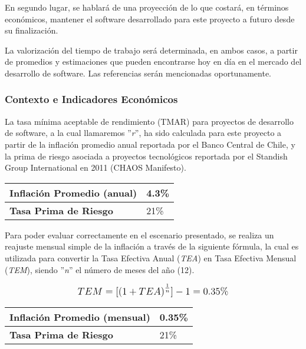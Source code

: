 En segundo lugar, se hablará de una proyección de lo que costará, en términos económicos, mantener el software desarrollado para este proyecto a futuro desde su finalización.

La valorización del tiempo de trabajo será determinada, en ambos casos, a partir de promedios y estimaciones que pueden encontrarse hoy en día en el mercado del desarrollo de software. Las referencias serán mencionadas oportunamente.

\subsubsection{Contexto e Indicadores Económicos}
\label{feasibility:economic:context}
La tasa mínima aceptable de rendimiento (TMAR) para proyectos de desarrollo de software, a la cual llamaremos ''\textit{r}'', ha sido calculada para este proyecto a partir de la inflación promedio anual reportada por el Banco Central de Chile, y la prima de riesgo asociada a proyectos tecnológicos reportada por el Standish Group International en 2011 (CHAOS Manifesto).

\begin{center}
	\begin{tabular}{ | p{7cm} | p{5cm}|}
		\hline
		{\textbf{Inflación Promedio (anual)}} & 4.3\%  \\ \hline
		{\textbf{Tasa Prima de Riesgo}} & 21\% \\ \hline
	\end{tabular}
\end{center}

Para poder evaluar correctamente en el escenario presentado, se realiza un reajuste mensual simple de la inflación a través de la siguiente fórmula, la cual es utilizada para convertir la Tasa Efectiva Anual (\textit{TEA}) en Tasa Efectiva Mensual (\textit{TEM}), siendo ''\textit{n}'' el número de meses del año (12).

\[
\mathlarger{
	TEM = [\left(1 + TEA\right)^\frac{1}{n}] - 1 = 0.35\%
}
\]

\begin{center}
	\begin{tabular}{ | p{7cm} | p{5cm}|}
		\hline
		{\textbf{Inflación Promedio (mensual)}} & 0.35\%  \\ \hline
		{\textbf{Tasa Prima de Riesgo}} & 21\% \\ \hline
	\end{tabular}
\end{center}

